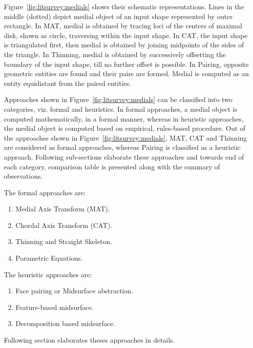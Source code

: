 
Figure~\ref{fig:litsurvey:medials} shows their schematic representations. Lines in the middle (dotted) depict medial object of an input shape represented by outer rectangle. In MAT, medial is obtained by tracing loci of the centers of maximal disk, shown as circle, traversing within the input shape. In CAT, the input shape is triangulated first, then medial is obtained by joining midpoints of the sides of the triangle. In Thinning, medial is obtained by successively offsetting the boundary of the input shape, till no further offset is possible. In Pairing, opposite geometric entities are found and their pairs are formed. Medial is computed as an entity equidistant from the paired entities.

Approaches shown in Figure~\ref{fig:litsurvey:medials} can be classified into two categories, viz. formal and heuristics. In formal approaches, a medial object is computed mathematically, in a formal manner, whereas in heuristic approaches, the medial object is computed based on empirical, rules-based procedure.
Out of the approaches shown in Figure~\ref{fig:litsurvey:medials}, MAT, CAT and Thinning are considered as formal approaches, whereas Pairing is classified as a heuristic approach.  Following sub-sections elaborate these approaches and towards end of each category, comparison table is presented along with the summary of observations.

The formal approaches are:

\begin{enumerate}[noitemsep,topsep=2pt,parsep=2pt,partopsep=2pt]
	\item  Medial Axis Transform (MAT).
	\item Chordal  Axis Transform (CAT).
	\item Thinning and Straight Skeleton.
	\item Parametric Equations.
\end{enumerate}

The heuristic approaches are:

\begin{enumerate}[noitemsep,topsep=2pt,parsep=2pt,partopsep=2pt]
	\item Face pairing or Midsurface abstraction.
	\item Feature-based midsurface.
	\item Decomposition based midsurface.
\end{enumerate}

Following section elaborates theses approaches in details.
 
